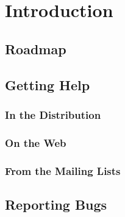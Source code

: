 %


\section{Introduction}
\label{sec:intro}
\ytbd

\subsection{Roadmap}
\label{sec:roadmap}
\ytbd


\subsection{Getting Help}
\label{sec:help}
\ytbd


\subsubsection{In the Distribution}
\ytbd


\subsubsection{On the Web}
\ytbd


\subsubsection{From the Mailing Lists}
\ytbd


\subsection{Reporting Bugs}
\label{sec:bugs}
\ytbd



